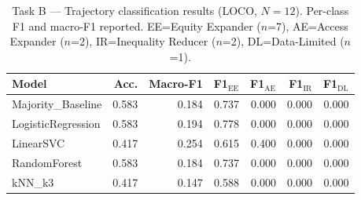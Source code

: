 \begin{table}[htbp]
\centering
\caption{Task B — Trajectory classification results (LOCO, $N=12$). Per-class F1 and macro-F1 reported. EE=Equity Expander ($n$=7), AE=Access Expander ($n$=2), IR=Inequality Reducer ($n$=2), DL=Data-Limited ($n$=1).}
\label{tab:taskB}
\begin{tabular}{lrrrrrr}
\toprule
Model & Acc. & Macro-F1 & F1$_{\text{EE}}$ & F1$_{\text{AE}}$ & F1$_{\text{IR}}$ & F1$_{\text{DL}}$ \\
\midrule
Majority_Baseline & 0.583 & 0.184 & 0.737 & 0.000 & 0.000 & 0.000 \\
LogisticRegression & 0.583 & 0.194 & 0.778 & 0.000 & 0.000 & 0.000 \\
LinearSVC & 0.417 & 0.254 & 0.615 & 0.400 & 0.000 & 0.000 \\
RandomForest & 0.583 & 0.184 & 0.737 & 0.000 & 0.000 & 0.000 \\
kNN_k3 & 0.417 & 0.147 & 0.588 & 0.000 & 0.000 & 0.000 \\
\bottomrule
\end{tabular}
\end{table}